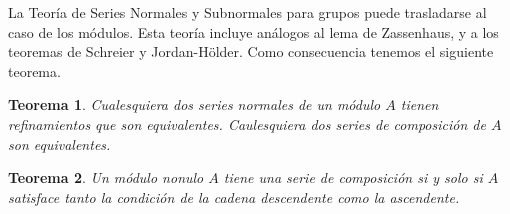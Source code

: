 \documentclass{report}
\newtheorem{theorem}{Teorema}
\begin{document}
  La Teoría de Series Normales y Subnormales para grupos puede trasladarse al caso de los módulos.
  Esta teoría incluye análogos al lema de Zassenhaus, y a los teoremas de Schreier y Jordan-Hölder.
  Como consecuencia tenemos el siguiente teorema.
  \begin{theorem}
    \label{theorem:refinementAndEquivalenceOfNormalSeries}
    Cualesquiera dos series normales de un módulo \(A\) tienen refinamientos que son equivalentes.
    Caulesquiera dos series de composición de \(A\) son equivalentes.
  \end{theorem}


  \begin{theorem}
    \label{theorem:compositionSeriesAndChainConditions}
    Un módulo nonulo \(A\) tiene una serie de composición si y solo si \(A\) satisface tanto la condición de la cadena descendente como la ascendente.
  \end{theorem}
\end{document}
